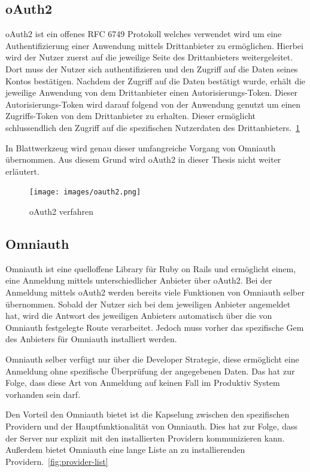 \documentclass[11pt]{article}
\begin{document}
	\subsection{oAuth2}
	\label{sec: oauth2}
	\gls{oAuth2} ist ein offenes \gls{RFC} 6749 Protokoll welches verwendet wird um eine Authentifizierung einer Anwendung mittels Drittanbieter zu ermöglichen. Hierbei wird der Nutzer zuerst auf die jeweilige Seite des Drittanbieters weitergeleitet. Dort muss der Nutzer sich authentifizieren und den Zugriff auf die Daten seines Kontos bestätigen. Nachdem der Zugriff auf die Daten bestätigt wurde, erhält die jeweilige Anwendung von dem Drittanbieter einen Autorisierungs-Token. Dieser Autorisierungs-Token wird darauf folgend von der Anwendung genutzt um einen Zugriffs-Token von dem Drittanbieter zu erhalten. Dieser ermöglicht schlussendlich den Zugriff auf die spezifischen Nutzerdaten des Drittanbieters.~\ref{fig:oauth2}
	
	In Blattwerkzeug wird genau dieser umfangreiche Vorgang von Omniauth übernommen. Aus diesem Grund wird oAuth2 in dieser Thesis nicht weiter erläutert.
	
	\begin{figure}[h]
		\texttt{[image: images/oauth2.png]}
		\caption{oAuth2 verfahren}
		\label{fig:oauth2}
	\end{figure}

	\subsection{Omniauth}
	\label{sec: omniauth}
	Omniauth ist eine quelloffene Library für Ruby on Rails und ermöglicht einem, eine Anmeldung mittels unterschiedlicher Anbieter über \gls{oAuth2}. Bei der Anmeldung mittels oAuth2 werden bereits viele Funktionen von Omniauth selber übernommen. Sobald der Nutzer sich bei dem jeweiligen Anbieter angemeldet hat, wird die Antwort des jeweiligen Anbieters automatisch über die von Omniauth festgelegte Route verarbeitet. Jedoch muss vorher das spezifische Gem des Anbieters für Omniauth installiert werden.
	
	Omniauth selber verfügt nur über die Developer Strategie, diese ermöglicht eine Anmeldung ohne spezifische Überprüfung der angegebenen Daten. Das hat zur Folge, dass diese Art von Anmeldung auf keinen Fall im Produktiv System vorhanden sein darf.
	
	Den Vorteil den Omniauth bietet ist die Kapselung zwischen den spezifischen Providern und der Hauptfunktionalität von Omniauth. Dies hat zur Folge, dass der Server nur explizit mit den installierten Providern kommunizieren kann. Außerdem bietet Omniauth eine lange Liste an zu installierenden Providern.~\ref{fig:provider-list}
	
\end{document}
